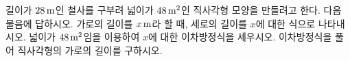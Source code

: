 길이가 $28\mkern3mu \mathrm{m}$인 철사를 구부려 넓이가 $48\mkern3mu \mathrm{m}^2$인 직사각형 모양을 만들려고 한다. 다음 물음에 답하시오. 
 가로의 길이를 $x\mkern3mu \mathrm{m}$라 할 때, 세로의 길이를 $x$에 대한 식으로 나타내시오.
 넓이가 $48\mkern3mu \mathrm{m}^2$임을 이용하여 $x$에 대한 이차방정식을 세우시오.
 이차방정식을 풀어 직사각형의 가로의 길이를 구하시오. 
